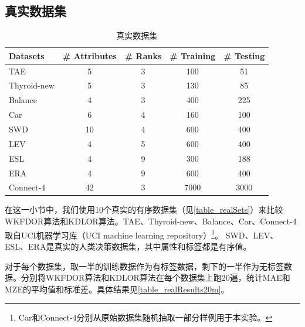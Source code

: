 \subsection{真实数据集}
\label{wkfdor_realData}

\begin{table}[!htbp]
\caption{真实数据集}
\label{table_realSets}
\centering
\begin{tabular}{l|cccc}
\toprule
Datasets & \# Attributes & \# Ranks & \# Training & \# Testing\\
\midrule
TAE & 5 & 3 & 100 & 51\\
Thyroid-new & 5 & 3 & 130 & 85\\
Balance & 4 & 3 & 400 & 225\\
Car & 6 & 4 & 160 & 100\\
SWD & 10 & 4 & 600 & 400\\
LEV & 4 & 5 & 600 & 400\\
ESL & 4 & 9 & 300 & 188\\
ERA & 4 & 9 & 600 & 400\\
Connect-4 & 42 & 3 & 7000 & 3000\\
\bottomrule
\end{tabular}
\end{table}

在这一小节中，我们使用10个真实的有序数据集（见\autoref{table_realSets}）来比较WKFDOR算法和KDLOR算法。TAE、Thyroid-new、Balance、Car、Connect-4取自UCI机器学习库（UCI machine learning repository）\footnote{Car和Connect-4分别从原始数据集随机抽取一部分样例用于本实验。}\citep{Bache+Lichman:2013}。
SWD、LEV、ESL、ERA是真实的人类决策数据集，其中属性和标签都是有序值\citep{ben2006generating}。

对于每个数据集，取一半的训练数据作为有标签数据，剩下的一半作为无标签数据。分别将WKFDOR算法和KDLOR算法在每个数据集上跑20遍，统计MAE和MZE的平均值和标准差。具体结果见\autoref{table_realResults20m}。

